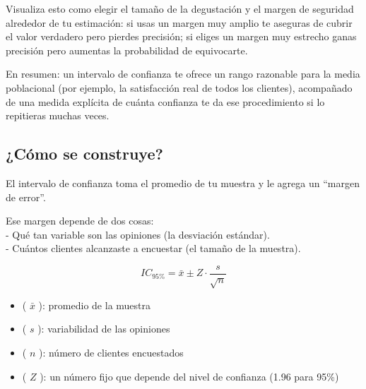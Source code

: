 \documentclass[
  spanish,
  letterpaper,
  DIV=11,
  numbers=noendperiod]{scrreprt}
\providecommand{\tightlist}{%
  \setlength{\itemsep}{0pt}\setlength{\parskip}{0pt}}
\begin{document}
Visualiza esto como elegir el tamaño de la degustación y el margen de
seguridad alrededor de tu estimación: si usas un margen muy amplio te
aseguras de cubrir el valor verdadero pero pierdes precisión; si eliges
un margen muy estrecho ganas precisión pero aumentas la probabilidad de
equivocarte.

En resumen: un intervalo de confianza te ofrece un rango razonable para
la media poblacional (por ejemplo, la satisfacción real de todos los
clientes), acompañado de una medida explícita de cuánta confianza te da
ese procedimiento si lo repitieras muchas veces.

\subsection{¿Cómo se construye?}\label{cuxf3mo-se-construye}

El intervalo de confianza toma el promedio de tu muestra y le agrega un
``margen de error''.

Ese margen depende de dos cosas:\\
- Qué tan variable son las opiniones (la desviación estándar).\\
- Cuántos clientes alcanzaste a encuestar (el tamaño de la muestra).

\begin{tcolorbox}[enhanced jigsaw, toptitle=1mm, opacitybacktitle=0.6, leftrule=.75mm, arc=.35mm, title=\textcolor{quarto-callout-tip-color}{\faLightbulb}\hspace{0.5em}{Fórmula del intervalo}, colback=white, bottomrule=.15mm, colbacktitle=quarto-callout-tip-color!10!white, opacityback=0, bottomtitle=1mm, breakable, rightrule=.15mm, coltitle=black, left=2mm, titlerule=0mm, colframe=quarto-callout-tip-color-frame, toprule=.15mm]

\[
IC_{95\%} = \bar{x} \pm Z \cdot \frac{s}{\sqrt{n}}
\]

\begin{itemize}
\tightlist
\item
  ( \(\bar{x}\) ): promedio de la muestra\\
\item
  ( \(s\) ): variabilidad de las opiniones\\
\item
  ( \(n\) ): número de clientes encuestados\\
\item
  ( \(Z\) ): un número fijo que depende del nivel de confianza (1.96
  para 95\%)\\
\end{itemize}

\end{tcolorbox}
\end{document}
